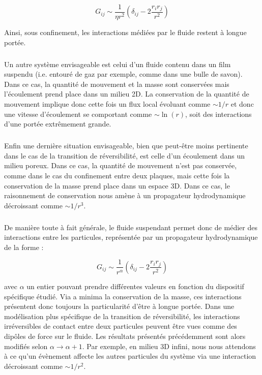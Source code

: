 \begin{equation}
	G_{ij} \sim \frac{1}{\eta r^2}\left( \delta_{ij}-2\frac{r_ir_j}{r^2} \right)
\end{equation}

\noindent Ainsi, sous confinement, les interactions médiées par le fluide restent à longue portée.

\subparagraph{}Un autre système envisageable est celui d'un fluide contenu dans un film suspendu (i.e. entouré de gaz par exemple, comme dans une bulle de savon). Dans ce cas, la quantité de mouvement et la masse sont conservées mais l'écoulement prend place dans un milieu 2D. La conservation de la quantité de mouvement implique donc cette fois un flux local évoluant comme $\sim 1/r$ et donc une vitesse d'écoulement se comportant comme $\sim \ln (r)$, soit des interactions d'une portée extrêmement grande.

\subparagraph{}Enfin une dernière situation envisageable, bien que peut-être moins pertinente dans le cas de la transition de réversibilité, est celle d'un écoulement dans un milieu poreux. Dans ce cas, la quantité de mouvement n'est pas conservée, comme dans le cas du confinement entre deux plaques, mais cette fois la conservation de la masse prend place dans un espace 3D. Dans ce cas, le raisonnement de conservation nous amène à un propagateur hydrodynamique décroissant comme $\sim 1/r^3$.

\subparagraph{}De manière toute à fait générale, le fluide suspendant permet donc de médier des interactions entre les particules, représentée par un propagateur hydrodynamique de la forme :

\begin{equation}
	G_{ij} \sim \frac{1}{r^\alpha}\left( \delta_{ij}-2\frac{r_ir_j}{r^2} \right)
\end{equation}

\noindent avec $\alpha$ un entier pouvant prendre différentes valeurs en fonction du dispositif spécifique étudié. Via a minima la conservation de la masse, ces interactions présentent donc toujours la particularité d'être à longue portée. Dans une modélisation plus spécifique de la transition de réversibilité, les interactions irréversibles de contact entre deux particules peuvent être vues comme des dipôles de force sur le fluide. Les résultats présentés précédemment sont alors modifiés selon $\alpha \rightarrow \alpha +1$. Par exemple, en milieu 3D infini, nous nous attendons à ce qu'un évènement affecte les autres particules du système via une interaction décroissant comme $\sim 1/r^2$.

